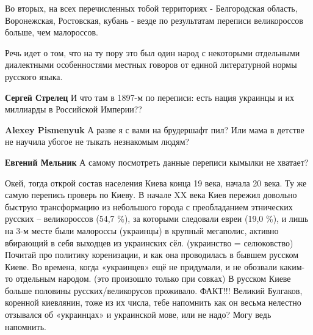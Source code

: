 \begin{itemize}
\begin{itemize}
Во вторых, на всех перечисленных тобой территориях - Белгородская область,
Воронежская, Ростовская, кубань - везде по результатам переписи великороссов
больше, чем малороссов.

Речь идет о том, что на ту пору это был один народ с некоторыми отдельными
диалектными особенностями местных говоров от единой литературной нормы русского
языка.

 
\textbf{Сергей Стрелец} И что там в 1897-м по переписи: есть нация украинцы и их миллиарды в Российской Империи??

 
\textbf{Alexey Pismenyuk} А разве я с вами на брудершафт пил? Или мама в детстве не научила убогое не тыкать незнакомым людям?

 
\textbf{Евгений Мельник} А самому посмотреть данные переписи кымылки не хватает?

 

Окей, тогда открой состав населения Киева конца 19 века, начала 20 века. Ту же
самую перепись проверь по Киеву. В начале XX века Киев пережил довольно быструю
трансформацию из небольшого города с преобладанием этнических русских –
великороссов (54,7 \%), за которыми следовали евреи (19,0 \%), и лишь на 3-м
месте были малороссы (украинцы) в крупный мегаполис, активно вбирающий в себя
выходцев из украинских сёл. (украинство = селюковство) Почитай про политику
коренизации, и как она проводилась в бывшем русском Киеве. Во времена, когда
«украинцев» ещё не придумали, и не обозвали каким-то отдельным народом. (это
произошло только при совках) В русском Киеве больше половины
русских/великорусов проживало. ФАКТ!!! Великий Булгаков, коренной киевлянин,
тоже из их числа, тебе напомнить как он весьма нелестно отзывался об
«украинцах» и украинской мове, или не надо? Могу ведь напомнить.



\end{itemize}
\end{itemize}
